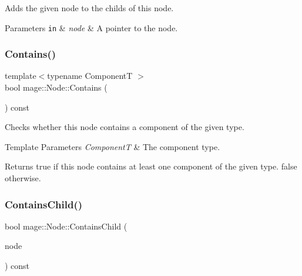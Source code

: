 Adds the given node to the childs of this node.


\begin{DoxyParams}[1]{Parameters}
\mbox{\tt in}  & {\em node} & A pointer to the node. \\
\hline
\end{DoxyParams}
\mbox{\label{classmage_1_1_node_ab3defd7329e8f87cff65cd8136c8f2d2}} 
\subsubsection{\texorpdfstring{Contains()}{Contains()}}
{\footnotesize\ttfamily template$<$typename ComponentT $>$ \\
bool mage\+::\+Node\+::\+Contains (\begin{DoxyParamCaption}{ }\end{DoxyParamCaption}) const\hspace{0.3cm}{\ttfamily [noexcept]}}

Checks whether this node contains a component of the given type.


\begin{DoxyTemplParams}{Template Parameters}
{\em ComponentT} & The component type. \\
\hline
\end{DoxyTemplParams}
\begin{DoxyReturn}{Returns}
{\ttfamily true} if this node contains at least one component of the given type. {\ttfamily false} otherwise. 
\end{DoxyReturn}
\mbox{\label{classmage_1_1_node_a2c1d85609b765c019a0a123f5f8a182a}} 
\subsubsection{\texorpdfstring{Contains\+Child()}{ContainsChild()}}
{\footnotesize\ttfamily bool mage\+::\+Node\+::\+Contains\+Child (\begin{DoxyParamCaption}\item[{\mbox{\hyperlink{classmage_1_1_proxy_ptr}{Proxy\+Ptr}}$<$ const \mbox{\hyperlink{classmage_1_1_node}{Node}} $>$}]{node }\end{DoxyParamCaption}) const}

